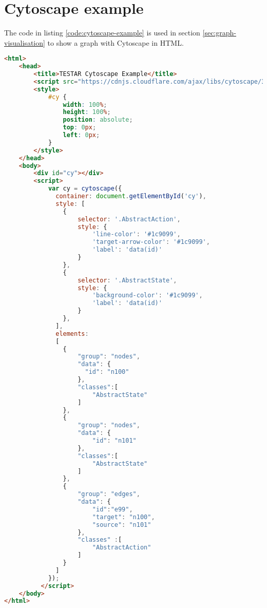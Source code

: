 \chapter{Cytoscape example} \label{appendix:cytoscape-example}

The code in listing \ref{code:cytoscape-example} is used in section \ref{sec:graph-visualisation} to show a graph with Cytoscape in HTML.

\begin{lstlisting}[language=html, caption=Graph representation in JSON, label=code:cytoscape-example]
<html>
    <head>
        <title>TESTAR Cytoscape Example</title>
        <script src="https://cdnjs.cloudflare.com/ajax/libs/cytoscape/3.5.2/cytoscape.min.js"></script>
        <style>
            #cy {
                width: 100%;
                height: 100%;
                position: absolute;
                top: 0px;
                left: 0px;
            }
        </style>
    </head>
    <body>
        <div id="cy"></div>
        <script>
            var cy = cytoscape({
              container: document.getElementById('cy'),
              style: [
                {
                    selector: '.AbstractAction',
                    style: {
                        'line-color': '#1c9099',
                        'target-arrow-color': '#1c9099',
                        'label': 'data(id)'
                    }
                },
                {
                    selector: '.AbstractState',
                    style: {
                        'background-color': '#1c9099',
                        'label': 'data(id)'
                    }
                },
              ],
              elements: 
              [
                {
                    "group": "nodes",
                    "data": {
                      "id": "n100" 
                    },
                    "classes":[
                        "AbstractState"
                    ]
                },
                {
                    "group": "nodes",
                    "data": {
                        "id": "n101"
                    },
                    "classes":[
                        "AbstractState"
                    ]
                },
                {
                    "group": "edges",
                    "data": {
                        "id":"e99",
                        "target": "n100",
                        "source": "n101"
                    },
                    "classes" :[
                        "AbstractAction"
                    ]
                }
              ]
            });
          </script>
    </body>
</html>
\end{lstlisting}